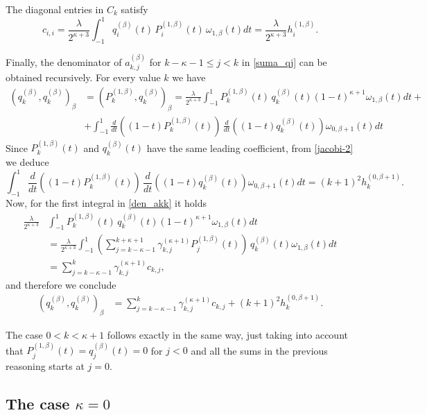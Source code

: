 \documentclass{amsart}
\theoremstyle{plain}%
\theoremstyle{definition}
\theoremstyle{remark}
\begin{document}
The diagonal entries in \(C_k\) satisfy
\[
c_{i,i} = \frac{\lambda}{2^{\kappa+3}} \int_{-1}^1
q_i^{(\beta)}(t) \, P_{i}^{(1, \beta)}(t)\,
 \omega_{1,\beta}(t) dt = \frac{\lambda}{2^{\kappa+3}} h_{i}^{(1, \beta)}.
\]
\medskip

Finally, the denominator of \(a^{(\beta)}_{k,j}\) for $k-\kappa-1 \leqslant j < k$ in \eqref{suma_qj} can be obtained recursively. For every value \(k\) we have
\begin{align}
(q_k^{(\beta)}, q_k^{(\beta)})_{\beta} &= (P_{k}^{(1, \beta)}, q_k^{(\beta)})_{\beta} = \frac{\lambda}{2^{\kappa+3}} \int_{-1}^1
P_{k}^{(1, \beta)}(t)\, q_k^{(\beta)}(t)(1-t)^{\kappa+1} \omega_{1,\beta}(t) dt + \nonumber\\
& + \int_{-1}^1 \frac{d}{dt}\left((1-t)P_{k}^{(1, \beta)}(t)\right)\, \frac{d}{dt}\left((1-t)q_k^{(\beta)}(t)\right) \omega_{0,\beta+1}(t) dt \label{den_akk}
\end{align}
Since \(P_{k}^{(1, \beta)}(t)\) and \(q_k^{(\beta)}(t)\) have the same leading coefficient, from \eqref{jacobi-2} we deduce 
\[
\int_{-1}^1 \frac{d}{dt}\left((1-t)P_{k}^{(1, \beta)}(t)\right)\, \frac{d}{dt}\left((1-t)q_k^{(\beta)}(t)\right) \omega_{0,\beta+1}(t) dt = (k+1)^2 h_{k}^{(0, \beta+1)}.
\]
Now, for the first integral in \eqref{den_akk} it holds
\begin{align}
\frac{\lambda}{2^{\kappa+3}} & \int_{-1}^1
P_{k}^{(1, \beta)}(t)\, q_k^{(\beta)}(t)(1-t)^{\kappa+1} \omega_{1,\beta}(t) dt \nonumber\\
&= \frac{\lambda}{2^{\kappa+3}} \int_{-1}^1 \left(
\sum_{j=k-\kappa-1}^{k+\kappa+1} \gamma_{k,j}^{(\kappa+1)} P_j^{(1,\beta)}(t)\right)\, q_k^{(\beta)}(t) \omega_{1,\beta}(t) dt \label{prim_int}\\
& = \sum_{j=k-\kappa-1}^{k} \gamma_{k,j}^{(\kappa+1)} c_{k,j},\nonumber
\end{align}
and therefore we conclude
\begin{align*}
(q_k^{(\beta)}, q_k^{(\beta)})_{\beta} &= \sum_{j=k-\kappa-1}^{k} \gamma_{k,j}^{(\kappa+1)} c_{k,j} + (k+1)^2 h_{k}^{(0, \beta+1)}. 
\end{align*}

\medskip

The case \(0<k<\kappa+1\) follows exactly in the same way, just taking into account that \(P_{j}^{(1, \beta)}(t) = q_j^{(\beta)}(t) = 0\) for \(j<0\) and  all the sums in the previous reasoning starts at \(j = 0\).


\subsection{The case \(\kappa = 0\)}
\end{document}

